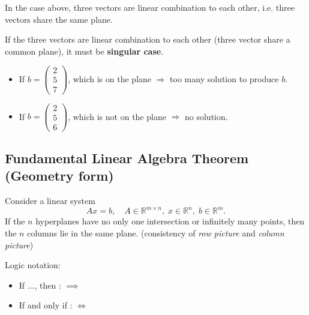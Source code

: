 \begin{enumerate}[label=(\arabic*)]
    In the case above, three vectors are linear combination to each other, i.e. three vectors share the same plane.
    
    \begin{lemma}
        If the three vectors are linear combination to each other (three vector share a common plane), it must be \textbf{singular case}.
        \begin{itemize}
            \item If \( b=
            \left(
            \begin{matrix}
                2 \\5 \\7
            \end{matrix}\right)
            \), which is on the plane \(\Rightarrow\) too many solution to produce $b$.
            \item If \( b=
            \left(
            \begin{matrix}
                2 \\5 \\6
            \end{matrix}\right)
            \), which is not on the plane \(\Rightarrow\) no solution.
        \end{itemize}
    \end{lemma}
\end{enumerate}

\newpage
\subsection{Fundamental Linear Algebra Theorem (Geometry form)}

\begin{theorem}
Consider a linear system
\[
A x = b, \quad A \in \mathbb{R}^{m \times n}, \; x \in \mathbb{R}^n, \; b \in \mathbb{R}^m.
\]
If the $n$ hyperplanes have no only one intersection or infinitely many points, then the $n$ columns lie in the same plane. (consistency of \emph{row picture} and \emph{column picture})

\begin{notation} Logic notation:
    \begin{itemize}
        \item If ..., then : \(\implies\)
        \item If and only if : \(\iff\)
    \end{itemize}
\end{notation}
\end{theorem}